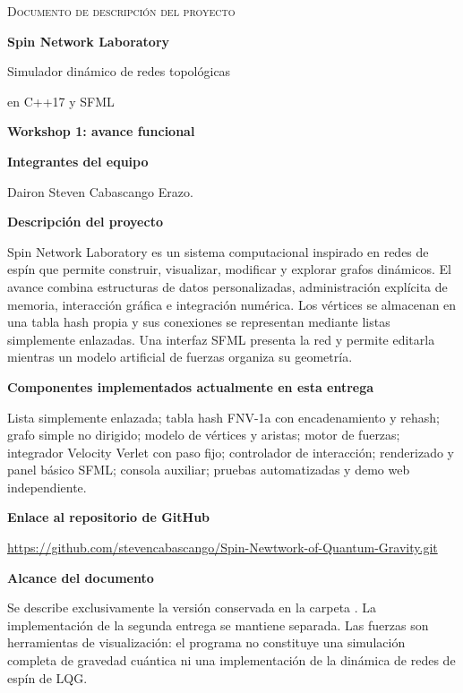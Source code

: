 \documentclass[11pt,a4paper]{article}
\newcommand{\archivo}[1]{\texttt{\detokenize{#1}}}
\begin{document}
\begin{center}
{\small\scshape Documento de descripción del proyecto}\par
\vspace{1.2cm}
{\Huge\bfseries Spin Network Laboratory}\par
\vspace{0.45cm}
{\Large Simulador dinámico de redes topológicas\par en C++17 y SFML}\par
\vspace{0.8cm}
{\large\bfseries Workshop 1: avance funcional}\par
\vspace{0.8cm}
\end{center}
\textbf{Integrantes del equipo}\par
Dairon Steven Cabascango Erazo.

\textbf{Descripción del proyecto}\par
Spin Network Laboratory es un sistema computacional inspirado en redes de espín que permite construir, visualizar, modificar y explorar grafos dinámicos. El avance combina estructuras de datos personalizadas, administración explícita de memoria, interacción gráfica e integración numérica. Los vértices se almacenan en una tabla hash propia y sus conexiones se representan mediante listas simplemente enlazadas. Una interfaz SFML presenta la red y permite editarla mientras un modelo artificial de fuerzas organiza su geometría.

\textbf{Componentes implementados actualmente en esta entrega}\par
Lista simplemente enlazada; tabla hash FNV-1a con encadenamiento y rehash; grafo simple no dirigido; modelo de vértices y aristas; motor de fuerzas; integrador Velocity Verlet con paso fijo; controlador de interacción; renderizado y panel básico SFML; consola auxiliar; pruebas automatizadas y demo web independiente.

\textbf{Enlace al repositorio de GitHub}\par
\url{https://github.com/stevencabascango/Spin-Newtwork-of-Quantum-Gravity.git}

\textbf{Alcance del documento}\par
Se describe exclusivamente la versión conservada en la carpeta \archivo{Workshop 1}. La implementación de la segunda entrega se mantiene separada. Las fuerzas son herramientas de visualización: el programa no constituye una simulación completa de gravedad cuántica ni una implementación de la dinámica de redes de espín de LQG.
\end{document}
